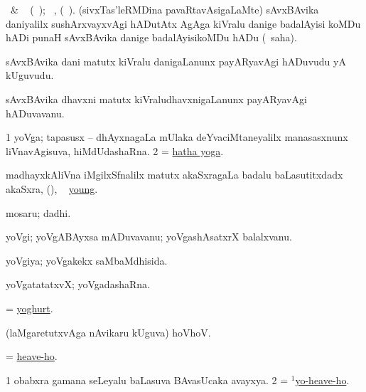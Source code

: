 \bentry
{} 
\gl{\sakirx} 
\bmng
\eng{[}\BU\ \& \BUkaq\  (\ame\ ); \vakaq\ , (\ame\ )\eng{]}. 
(sivxTas'leRMDina pavaRtavAsigaLaMte) sAvxBAvika daniyalilx sushArxvayxvAgi hADutAtx AgAga kiVralu danige badalAyisi koMDu hADi punaH sAvxBAvika danige badalAyisikoMDu hADu (\akirx\ saha).
\emng
\eentry

\bentry
{} 
\gl{\nA} 
\bmng
sAvxBAvika dani matutx kiVralu danigaLanunx payARyavAgi hADuvudu yA kUguvudu.
\emng
\eentry

\bentry
{} 
\gl{\nA} 
\bmng
sAvxBAvika dhavxni matutx kiVraludhavxnigaLanunx payARyavAgi hADuvavanu.
\emng
\eentry

\bentry
{} 
\gl{\nA} 
\bmng
\bnum
\num{1} yoVga; tapasusx -- dhAyxnagaLa mUlaka deYvaciMtaneyalilx manasasxnunx liVnavAgisuva, hiMdUdashaRna.   
\num{2} = \hyperref{kandict_h.pdf}{H}{hatha yoga}{hatha yoga}.
\enum
\emng 
\eentry

\bentry
{} 
\gl{\nA} 
\bmng
madhayxkAliVna iMgilxSfnalilx   matutx  akaSxragaLa badalu baLasutitxdadx akaSxra, ({\yoghsymb{}}), \udA\  \hyperlink{young(1)}{young}.
\emng
\eentry

\bentry
{} 
\gl{\nA} 
\bmng
mosaru; dadhi.
\emng
\eentry

\bentry
{} 
\gl{\nA} 
\bmng
yoVgi; yoVgABAyxsa mADuvavanu; yoVgashAsatxrX balalxvanu.
\emng
\eentry

\bentry
{} 
\gl{\gu} 
\bmng
yoVgiya; yoVgakekx saMbaMdhisida.
\emng
\eentry

\bentry
{} 
\gl{\nA}
\bmng
yoVgatatatxvX; yoVgadashaRna.
\emng
\eentry

\bentry
{} 
\gl{\nA} 
\bmng
= \hyperlink{yoghurt}{yoghurt}.
\emng
\eentry

\bentry
{} 
\gl{\BAavayx} 
\bmng
(laMgaretutxvAga nAvikaru kUguva) hoVhoV.
\emng
\eentry

\bentry
{} 
\gl{\nA} 
\bmng
= \hyperref{kandict_h.pdf}{H}{heave-ho}{heave-ho}.
\emng
\eentry

\bentry
{} 
\gl{\BAavayx} 
\bmng
\bnum
\num{1} obabxra gamana seLeyalu baLasuva BAvasUcaka avayxya. 
\num{2} = \hyperlink{yo-heave-ho(1)}{$^1$yo-heave-ho}.
\enum
\emng
\eentry

